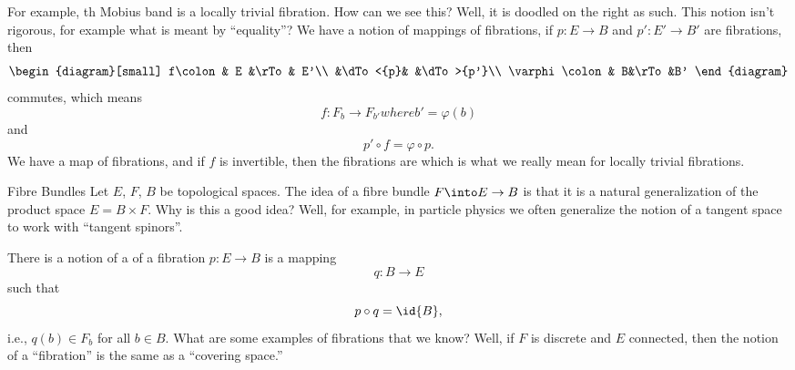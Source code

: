 \noindent{}For example, th Mobius band is a locally trivial
fibration. How can we see this? Well, it is doodled on the right
as such. This notion isn't rigorous, for example what is meant by
``equality''? We have a notion of mappings of fibrations, if
$p\colon E\to B$ and $p'\colon E'\to B'$ are fibrations, then
\begin{equation}
\begin{diagram}[small]
f\colon& E &\rTo & E'\\
       &\dTo<{p}& &\dTo>{p'}\\
\varphi\colon& B&\rTo&B'
\end{diagram}
\end{equation}
commutes, which means
\begin{subequations}
\begin{equation}
f\colon F_{b}\to F_{b'}
\end{equation}
where 
\begin{equation}
b'=\varphi(b)
\end{equation}
\end{subequations}
and
\begin{equation}
p'\circ f=\varphi\circ p.
\end{equation}
We have a map of fibrations, and if $f$ is invertible, then the
fibrations are  which is what we really mean
for locally trivial fibrations.

\begin{Boxed}{Fibre Bundles}
Let $E$, $F$, $B$ be topological spaces.
The idea of a fibre bundle $F\into E\to B$ is that it is a
natural generalization of the product space $E=B\times F$. Why is
this a good idea? Well, for example, in particle physics we often
generalize the notion of a tangent space to work with ``tangent
spinors''. 
\end{Boxed}

There is a notion of a  of a fibration $p\colon
E\to B$ is a mapping
\begin{equation}
q\colon B\to E
\end{equation}
such that
\begin{equation}
p\circ q=\id{B},
\end{equation}
i.e., $q(b)\in F_{b}$ for all $b\in B$. What are some examples of
fibrations that we know? Well, if $F$ is discrete and $E$
connected, then the notion of a ``fibration'' is the same as a
``covering space.''

